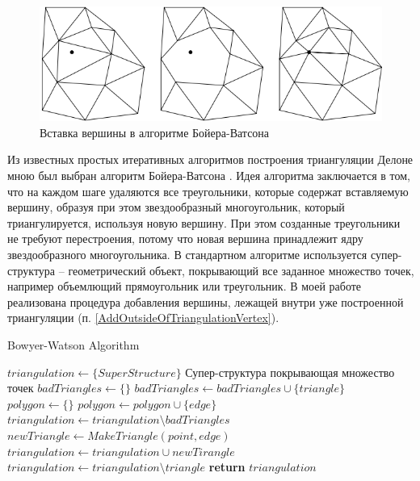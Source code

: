 \documentclass{fefu}
\newenvironment{algo}[1][]
  {\begin{algorithm}[#1]
     \selectlanguage{english}
     \floatname{algorithm}{Алгоритм}
  }
  {\end{algorithm}}
\begin{document}
\begin{figure}[H]
    \centering
    \includegraphics{images/BowyerWatson.png}
    \caption{Вставка вершины в алгоритме Бойера-Ватсона}
\end{figure}
Из известных простых итеративных алгоритмов построения триангуляции Делоне мною был выбран алгоритм Бойера-Ватсона
\cite{Bowyer, Watson}. Идея алгоритма заключается в том, что на каждом шаге удаляются все треугольники, которые
содержат вставляемую вершину, образуя при этом звездообразный многоугольник, который триангулируется, используя новую вершину.
При этом созданные треугольники не требуют перестроения, потому что новая вершина принадлежит ядру звездообразного многоугольника.
В стандартном алгоритме используется супер-структура -- геометрический объект, покрывающий все заданное множество точек,
например объемлющий прямоугольник или треугольник. В моей работе реализована процедура добавления вершины, лежащей внутри
уже построенной триангуляции (п. \ref{AddOutsideOfTriangulationVertex}).
\begin{algo}[H]
    \caption{Bowyer-Watson Algorithm}
    \begin{algorithmic}[1]
            \State $triangulation \gets \{SuperStructure\}$ \Comment Супер-структура покрывающая множество точек
                \State $badTriangles \gets \{\}$
                       \State $badTriangles \gets badTriangles \cup \{triangle\}$
                    \EndIf
                \EndFor
                \State $polygon \gets \{\}$
                            \State $polygon \gets polygon \cup \{edge\}$
                        \EndIf
                    \EndFor
                \EndFor
                \State $triangulation \gets triangulation \setminus badTriangles$
                    \State $newTriangle \gets MakeTriangle(point, edge)$
                    \State $triangulation \gets triangulation \cup newTirangle$
                \EndFor
                        \State $triangulation \gets triangulation \setminus triangle$
                    \EndIf
                \EndFor
            \EndFor
            \State \textbf{return} $triangulation$
        \EndProcedure
    \end{algorithmic}
\end{algo}
\end{document}
